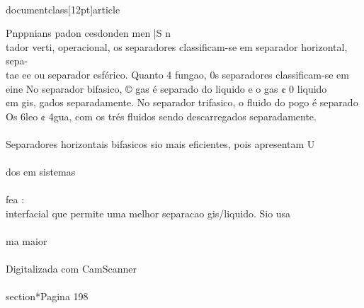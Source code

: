 \\documentclass[12pt]{article}
\begin{document}
Pnppnians padon cesdonden men |S n\\
tador verti, operacional, os separadores classificam-se em separador horizontal, sepa-\\
tae ee ou separador esférico. Quanto 4 fungao, 0s separadores classificam-se em\\
eine No separador bifasico, © gas é separado do liquido e o gas ¢ 0 liquido\\
¢m gis, gados separadamente. No separador trifasico, o fluido do pogo é separado\\
Os 6leo ¢ 4gua, com os trés fluidos sendo descarregados separadamente.\\
\\
Separadores horizontais bifasicos sio mais eficientes, pois apresentam U\\
\\
dos em sistemas\\
\\
fea :\\
interfacial que permite uma melhor separacao gis/liquido. Sio usa\\
\\
ma maior\\
\\
Digitalizada com CamScanner\\

\\section*{Pagina 198}
\end{document}
